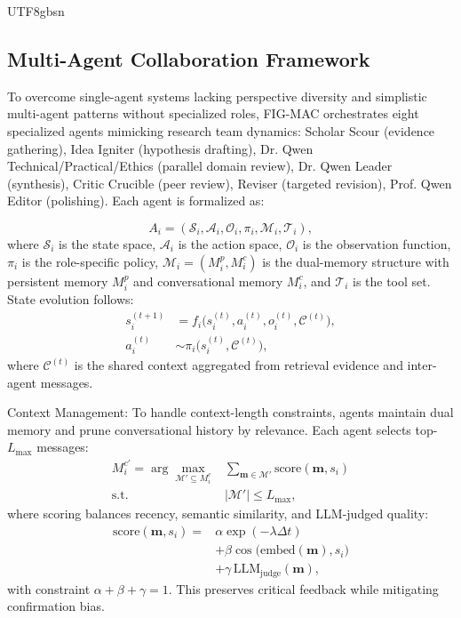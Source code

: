 \documentclass[11pt]{article}
\begin{document}
\begin{CJK}{UTF8}{gbsn}
\subsection{Multi-Agent Collaboration Framework}
\label{sec:workflow}

To overcome single-agent systems lacking perspective diversity and simplistic multi-agent patterns without specialized roles, FIG-MAC orchestrates eight specialized agents mimicking research team dynamics: Scholar Scour (evidence gathering), Idea Igniter (hypothesis drafting), Dr. Qwen Technical/Practical/Ethics (parallel domain review), Dr. Qwen Leader (synthesis), Critic Crucible (peer review), Reviser (targeted revision), Prof. Qwen Editor (polishing). Each agent is formalized as:

\begin{equation}
    A_i = (\mathcal{S}_i, \mathcal{A}_i, \mathcal{O}_i, \pi_i, \mathcal{M}_i, \mathcal{T}_i),
\end{equation}
where $\mathcal{S}_i$ is the state space, $\mathcal{A}_i$ is the action space, $\mathcal{O}_i$ is the observation function, $\pi_i$ is the role-specific policy, $\mathcal{M}_i = (M_i^p, M_i^c)$ is the dual-memory structure with persistent memory $M_i^p$ and conversational memory $M_i^c$, and $\mathcal{T}_i$ is the tool set. State evolution follows:
\begin{align}
    s_i^{(t+1)} &= f_i\big(s_i^{(t)}, a_i^{(t)}, o_i^{(t)}, \mathcal{C}^{(t)}\big), \\
    a_i^{(t)} &\sim \pi_i\big(s_i^{(t)}, \mathcal{C}^{(t)}\big),
\end{align}
where $\mathcal{C}^{(t)}$ is the shared context aggregated from retrieval evidence and inter-agent messages.


Context Management: To handle context-length constraints, agents maintain dual memory and prune conversational history by relevance. Each agent selects top-$L_{\max}$ messages:
\begin{equation}
\begin{aligned}
    M_i^{c'} = \arg\max_{\mathcal{M}' \subseteq M_i^c} &\sum_{\mathbf{m} \in \mathcal{M}'} \text{score}(\mathbf{m}, s_i) \\
    \text{s.t.} \quad &|\mathcal{M}'| \leq L_{\max},
\end{aligned}
\end{equation}
where scoring balances recency, semantic similarity, and LLM-judged quality:
\begin{equation}
\begin{split}
    \text{score}(\mathbf{m}, s_i) = &\alpha \exp(-\lambda \Delta t) \\
    &+ \beta \cos\big(\text{embed}(\mathbf{m}), s_i\big) \\
    &+ \gamma\, \text{LLM}_{\text{judge}}(\mathbf{m}),
\end{split}
\end{equation}
with constraint $\alpha+\beta+\gamma=1$. This preserves critical feedback while mitigating confirmation bias.


\end{CJK}
\end{document}
